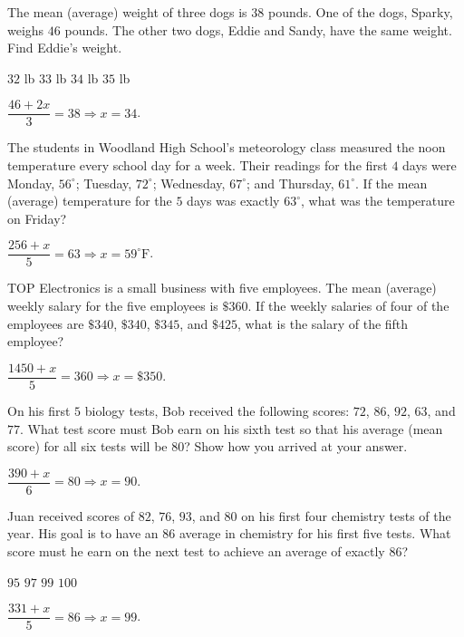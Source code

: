 \newpage



\question[5]
The mean (average) weight of three dogs is $38$ pounds. One of the dogs, Sparky, weighs $46$ pounds. The other two dogs, Eddie and Sandy, have the same weight. Find Eddie's weight.
\begin{choices}
  \choice $32$ lb
  \choice $33$ lb
  \CorrectChoice $34$ lb
  \choice $35$ lb
\end{choices}
\begin{solution}
  $\dfrac{46+2x}{3}=38\Rightarrow x=34$.
\end{solution}

\question[5]
The students in Woodland High School's meteorology class measured the noon temperature every school day for a week. Their readings for the first $4$ days were Monday, $56^{\circ}$; Tuesday, $72^{\circ}$; Wednesday, $67^{\circ}$; and Thursday, $61^{\circ}$. If the mean (average) temperature for the $5$ days was exactly $63^{\circ}$, what was the temperature on Friday?
\begin{solution}
  $\dfrac{256+x}{5}=63\Rightarrow x=59^{\circ}\mathrm{F}$.
\end{solution}

\question[5]
TOP Electronics is a small business with five employees. The mean (average) weekly salary for the five employees is $\$360$. If the weekly salaries of four of the employees are $\$340$, $\$340$, $\$345$, and $\$425$, what is the salary of the fifth employee?
\begin{solution}
  $\dfrac{1450+x}{5}=360\Rightarrow x=\$350$.
\end{solution}

\question[10]
On his first $5$ biology tests, Bob received the following scores: $72$, $86$, $92$, $63$, and $77$. What test score must Bob earn on his sixth test so that his average (mean score) for all six tests will be $80$? Show how you arrived at your answer.
\begin{solutionorbox}[1.4in]
  $\dfrac{390+x}{6}=80\Rightarrow x=90$.
\end{solutionorbox}


\newpage



\question[5]
Juan received scores of $82$, $76$, $93$, and $80$ on his first four chemistry tests of the year. His goal is to have an $86$ average in chemistry for his first five tests. What score must he earn on the next test to achieve an average of exactly $86$?
\begin{choices}
  \choice $95$
  \choice $97$
  \CorrectChoice $99$
  \choice $100$
\end{choices}
\begin{solution}
  $\dfrac{331+x}{5}=86\Rightarrow x=99$.
\end{solution}

